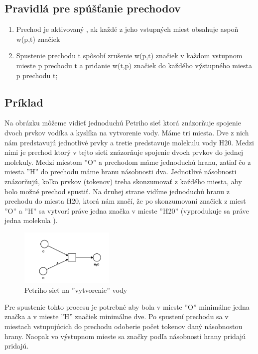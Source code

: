\subsection{Pravidlá pre spúšťanie prechodov}
\begin{enumerate}
	\item Prechod je aktivovaný , ak každé z jeho vstupných miest obsahuje aspoň w(p,t) značiek
	\item Spustenie prechodu t spôsobí zrušenie w(p,t) značiek v každom vstupnom mieste p prechodu t a pridanie w(t,p) značiek do každého výstupného miesta p prechodu t;	
\end{enumerate}

\subsection{Príklad}
Na obrázku môžeme vidieť jednoduchú Petriho sieť ktorá znázorňuje spojenie dvoch prvkov vodíka a kyslíka na vytvorenie vody. Máme tri miesta. Dve z nich nám predstavujú jednotlivé prvky a tretie predstavuje molekulu vody H20. Medzi nimi je prechod ktorý v tejto sieti znázorňuje spojenie dvoch prvkov do jednej molekuly. Medzi miestom ''O'' a prechodom máme jednoduchú hranu, zatiaľ čo z miesta ''H'' do prechodu máme hranu násobnosti dva. Jednotlivé násobnosti znázorňujú, koľko prvkov (tokenov) treba skonzumovať z každého miesta, aby bolo možné prechod spustiť. Na druhej strane vidíme jednoduchú hranu z prechodu do miesta H20, ktorá nám značí, že po skonzumovaní značiek z miest ''O'' a ''H'' sa vytvorí práve jedna značka v mieste ''H20'' (vyprodukuje sa práve jedna molekula ). 

\begin{figure}[h]
	\centerline{\includegraphics[width=0.4\textwidth]{images/vojvoda}}
	\caption{Petriho sieť na ''vytvorenie'' vody}
	\label{obr:voda}
\end{figure}


Pre spustenie tohto procesu je potrebné aby bola v mieste ''O'' minimálne jedna značka a v mieste ''H'' značiek minimálne dve. Po spustení prechodu sa v miestach vstupujúcich do prechodu odoberie počet tokenov daný násobnostou hrany. Naopak vo výstupnom mieste sa značky podľa násobnosti hrany pridajú pridajú.  

